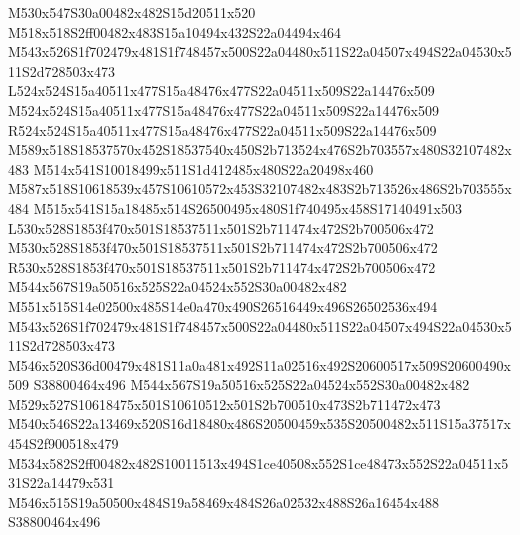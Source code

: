 \documentclass{article}
\begin{document}
\begin{multicols}{2}
M530x547S30a00482x482S15d20511x520 M518x518S2ff00482x483S15a10494x432S22a04494x464 M543x526S1f702479x481S1f748457x500S22a04480x511S22a04507x494S22a04530x511S2d728503x473 L524x524S15a40511x477S15a48476x477S22a04511x509S22a14476x509 M524x524S15a40511x477S15a48476x477S22a04511x509S22a14476x509 R524x524S15a40511x477S15a48476x477S22a04511x509S22a14476x509 M589x518S18537570x452S18537540x450S2b713524x476S2b703557x480S32107482x483 M514x541S10018499x511S1d412485x480S22a20498x460 M587x518S10618539x457S10610572x453S32107482x483S2b713526x486S2b703555x484 M515x541S15a18485x514S26500495x480S1f740495x458S17140491x503 L530x528S1853f470x501S18537511x501S2b711474x472S2b700506x472 M530x528S1853f470x501S18537511x501S2b711474x472S2b700506x472 R530x528S1853f470x501S18537511x501S2b711474x472S2b700506x472 M544x567S19a50516x525S22a04524x552S30a00482x482 M551x515S14e02500x485S14e0a470x490S26516449x496S26502536x494 M543x526S1f702479x481S1f748457x500S22a04480x511S22a04507x494S22a04530x511S2d728503x473 M546x520S36d00479x481S11a0a481x492S11a02516x492S20600517x509S20600490x509 S38800464x496 M544x567S19a50516x525S22a04524x552S30a00482x482 M529x527S10618475x501S10610512x501S2b700510x473S2b711472x473 M540x546S22a13469x520S16d18480x486S20500459x535S20500482x511S15a37517x454S2f900518x479 M534x582S2ff00482x482S10011513x494S1ce40508x552S1ce48473x552S22a04511x531S22a14479x531 M546x515S19a50500x484S19a58469x484S26a02532x488S26a16454x488 S38800464x496









\end{multicols}
\end{document}
